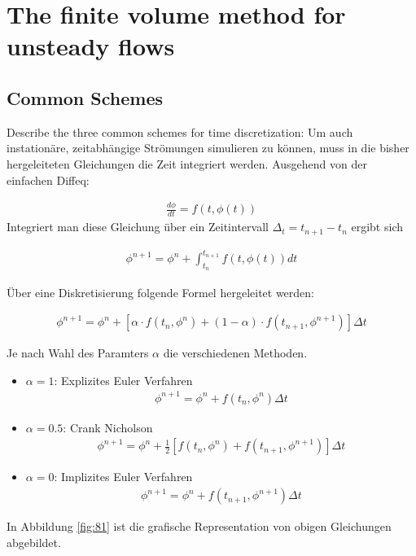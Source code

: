 \documentclass[a4paper]{scrartcl}
\begin{document}
\section{The finite volume method for unsteady flows}
\subsection{Common Schemes} Describe the three common schemes for time
discretization:
Um auch instationäre, zeitabhängige Strömungen simulieren zu können, muss in
die bisher hergeleiteten Gleichungen die Zeit integriert werden. Ausgehend von
der einfachen Diffeq:

\begin{align}
\frac{d\phi}{dt}=f(t,\phi(t))
\end{align}
Integriert man diese Gleichung über ein Zeitintervall $\Delta_t = t_{n+1}-t_n$
ergibt sich

\begin{align}
\phi^{n+1}=\phi^n + \int_{t_n}^{t_{n+1}} f(t,\phi(t))dt
\end{align}
 
Über eine Diskretisierung folgende Formel hergeleitet werden:

\begin{align}
\phi^{n+1}=\phi^n + \left[\alpha \cdot f(t_n,\phi^n)+(1-\alpha)\cdot
f(t_{n+1},\phi^{n+1})\right]\Delta t
\end{align}


Je nach Wahl des Paramters $\alpha$ die verschiedenen Methoden. \\
\begin{itemize}
  \item $\alpha = 1$: Explizites Euler Verfahren \begin{align}
  \phi^{n+1}= \phi^n + f(t_n,\phi^n) \Delta t
  \end{align}
  \item $\alpha= 0.5$: Crank Nicholson \begin{align}
  \phi^{n+1}=\phi^n + \frac{1}{2}
  \left[f(t_n,\phi^n)+f(t_{n+1},\phi^{n+1})\right]\Delta t
  \end{align}
  \item $\alpha = 0$: Implizites Euler Verfahren \begin{align}
  \phi^{n+1}=\phi^n + f(t_{n+1},\phi^{n+1})\Delta t
  \end{align}
\end{itemize}

In Abbildung \ref{fig:81} ist die grafische Representation von obigen
Gleichungen abgebildet.
\end{document}
